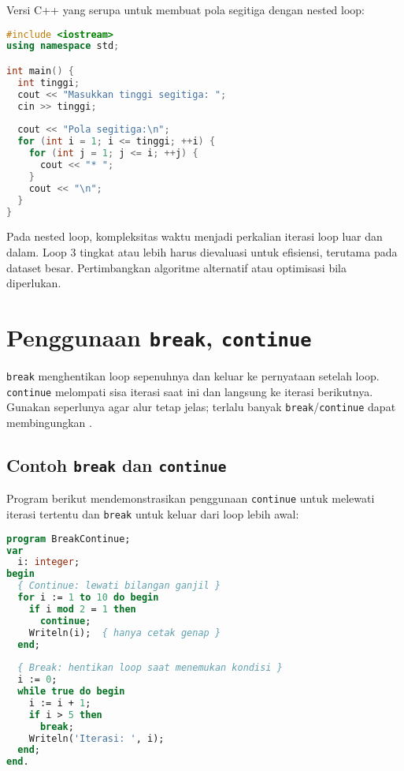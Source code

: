 \documentclass[../main.tex]{subfiles}
\begin{document}
Versi C++ yang serupa untuk membuat pola segitiga dengan nested loop:

\begin{lstlisting}[language=C++, caption={Pola bintang dengan nested loop (C++)}]
#include <iostream>
using namespace std;

int main() {
  int tinggi;
  cout << "Masukkan tinggi segitiga: ";
  cin >> tinggi;
  
  cout << "Pola segitiga:\n";
  for (int i = 1; i <= tinggi; ++i) {
    for (int j = 1; j <= i; ++j) {
      cout << "* ";
    }
    cout << "\n";
  }
}
\end{lstlisting}

Pada nested loop, kompleksitas waktu menjadi perkalian iterasi loop luar dan dalam. Loop 3 tingkat atau lebih harus dievaluasi untuk efisiensi, terutama pada dataset besar. Pertimbangkan algoritme alternatif atau optimisasi bila diperlukan.

\section{Penggunaan \texttt{break}, \texttt{continue}}
\texttt{break} menghentikan loop sepenuhnya dan keluar ke pernyataan setelah loop. \texttt{continue} melompati sisa iterasi saat ini dan langsung ke iterasi berikutnya. Gunakan seperlunya agar alur tetap jelas; terlalu banyak \texttt{break}/\texttt{continue} dapat membingungkan \parencite{gnu-c-manual,cpp-reference}.

\subsection{Contoh \texttt{break} dan \texttt{continue}}

Program berikut mendemonstrasikan penggunaan \texttt{continue} untuk melewati iterasi tertentu dan \texttt{break} untuk keluar dari loop lebih awal:

\begin{lstlisting}[language=Pascal, caption={break dan continue di Pascal}]
program BreakContinue;
var
  i: integer;
begin
  { Continue: lewati bilangan ganjil }
  for i := 1 to 10 do begin
    if i mod 2 = 1 then
      continue;
    Writeln(i);  { hanya cetak genap }
  end;
  
  { Break: hentikan loop saat menemukan kondisi }
  i := 0;
  while true do begin
    i := i + 1;
    if i > 5 then
      break;
    Writeln('Iterasi: ', i);
  end;
end.
\end{lstlisting}
\end{document}
